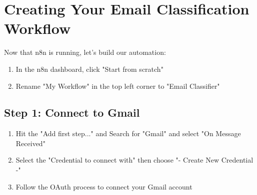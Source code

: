 \section{Creating Your Email Classification Workflow}

Now that n8n is running, let's build our automation:

\begin{enumerate}
    \item In the n8n dashboard, click "Start from scratch"
    \item Rename "My Workflow" in the top left corner to "Email Classifier"
    \begin{minipage}[t]{\linewidth}
        \raggedright
        \medskip
    \end{minipage}

\end{enumerate}

\subsection{Step 1: Connect to Gmail}

\begin{enumerate}
    \item Hit the "Add first step..." and Search for "Gmail" and select "On Message Received"
    \item Select the "Credential to connect with" then choose "- Create New Credential -"
    \item Follow the OAuth process to connect your Gmail account
  \end{enumerate}

